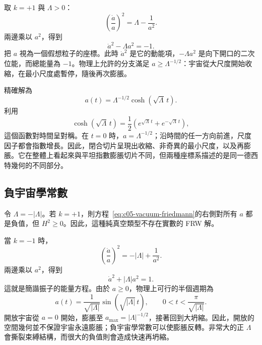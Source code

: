 取 \(k=+1\) 與 \(\Lambda>0\)：
\begin{equation}
\left(\frac{\dot a}{a}\right)^2=\Lambda-\frac{1}{a^2}.
\label{eq:c05-closed-vacuum}
\end{equation}
兩邊乘以 \(a^2\)，得到
\begin{equation}
\dot a^2-\Lambda a^2=-1.
\label{eq:c05-inverted-oscillator}
\end{equation}
把 \(a\) 視為一個假想粒子的座標。此時 \(\dot a^2\) 是它的動能項，\(-\Lambda a^2\) 是向下開口的二次位能，而總能量為 \(-1\)。物理上允許的分支滿足 \(a\geq\Lambda^{-1/2}\)：宇宙從大尺度開始收縮，在最小尺度處暫停，隨後再次膨脹。

精確解為
\begin{equation}
a(t)=\Lambda^{-1/2}\cosh(\sqrt{\Lambda}\,t).
\label{eq:c05-closed-desitter}
\end{equation}
利用
\begin{equation}
\cosh(\sqrt{\Lambda}\,t)
=
\frac12\left(e^{\sqrt{\Lambda}\,t}+e^{-\sqrt{\Lambda}\,t}\right),
\end{equation}
這個函數對時間呈對稱。在 \(t=0\) 時，\(a=\Lambda^{-1/2}\)；沿時間的任一方向前進，尺度因子都會指數增長。因此，閉合切片呈現出收縮、非奇異的最小尺度，以及再膨脹。它在整體上看起來與平坦指數膨脹切片不同，但兩種座標系描述的是同一德西特幾何的不同部分。

\subsection{負宇宙學常數}

令 \(\Lambda=-|\Lambda|\)。若 \(k=+1\)，則方程~\eqref{eq:c05-vacuum-friedmann}的右側對所有 \(a\) 都是負值，但 \(H^2\geq0\)。因此，這種純真空類型不存在實數的 FRW 解。

當 \(k=-1\) 時，
\begin{equation}
\left(\frac{\dot a}{a}\right)^2=-|\Lambda|+\frac{1}{a^2}.
\end{equation}
兩邊乘以 \(a^2\)，得到
\begin{equation}
\dot a^2+|\Lambda|a^2=1.
\label{eq:c05-negative-lambda-oscillator}
\end{equation}
這就是簡諧振子的能量方程。由於 \(a\geq0\)，物理上可行的半個週期為
\begin{equation}
a(t)=\frac{1}{\sqrt{|\Lambda|}}
\sin\!\left(\sqrt{|\Lambda|}\,t\right),
\qquad
0<t<\frac{\pi}{\sqrt{|\Lambda|}}.
\end{equation}
開放宇宙從 \(a=0\) 開始，膨脹至 \(a_{\max}=|\Lambda|^{-1/2}\)，接著回到大坍縮。因此，開放的空間幾何並不保證宇宙永遠膨脹；負宇宙學常數可以使膨脹反轉。非常大的正 \(\Lambda\) 會撕裂束縛結構，而很大的負值則會造成快速再坍縮。

